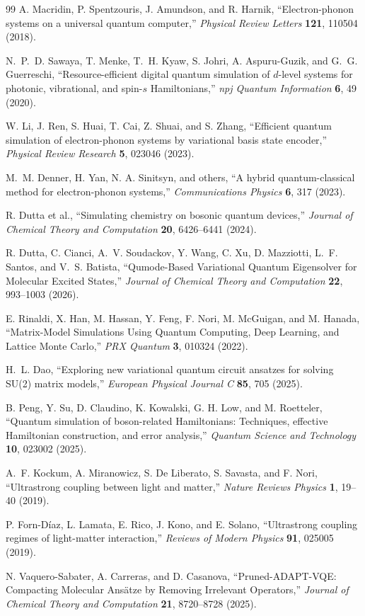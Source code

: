 \documentclass[
  reprint,
  amsmath,
  amssymb,
  aps,
  pra,
  nofootinbib,
  superscriptaddress,
  floatfix
]{revtex4-2}
\begin{document}
\begin{thebibliography}{99}
A. Macridin, P. Spentzouris, J. Amundson, and R. Harnik,
``Electron-phonon systems on a universal quantum computer,''
\emph{Physical Review Letters} \textbf{121}, 110504 (2018).

N.~P.~D. Sawaya, T. Menke, T.~H. Kyaw, S. Johri, A. Aspuru-Guzik, and G.~G. Guerreschi,
``Resource-efficient digital quantum simulation of $d$-level systems for photonic, vibrational, and spin-$s$ Hamiltonians,''
\emph{npj Quantum Information} \textbf{6}, 49 (2020).

W. Li, J. Ren, S. Huai, T. Cai, Z. Shuai, and S. Zhang,
``Efficient quantum simulation of electron-phonon systems by variational basis state encoder,''
\emph{Physical Review Research} \textbf{5}, 023046 (2023).

M.~M. Denner, H. Yan, N. A. Sinitsyn, and others,
``A hybrid quantum-classical method for electron-phonon systems,''
\emph{Communications Physics} \textbf{6}, 317 (2023).

R. Dutta et al.,
``Simulating chemistry on bosonic quantum devices,''
\emph{Journal of Chemical Theory and Computation} \textbf{20}, 6426--6441 (2024).

R. Dutta, C. Cianci, A.~V. Soudackov, Y. Wang, C. Xu, D. Mazziotti, L.~F. Santos, and V.~S. Batista,
``Qumode-Based Variational Quantum Eigensolver for Molecular Excited States,''
\emph{Journal of Chemical Theory and Computation} \textbf{22}, 993--1003 (2026).

E. Rinaldi, X. Han, M. Hassan, Y. Feng, F. Nori, M. McGuigan, and M. Hanada,
``Matrix-Model Simulations Using Quantum Computing, Deep Learning, and Lattice Monte Carlo,''
\emph{PRX Quantum} \textbf{3}, 010324 (2022).

H.~L. Dao,
``Exploring new variational quantum circuit ansatzes for solving SU(2) matrix models,''
\emph{European Physical Journal C} \textbf{85}, 705 (2025).

B. Peng, Y. Su, D. Claudino, K. Kowalski, G. H. Low, and M. Roetteler,
``Quantum simulation of boson-related Hamiltonians: Techniques, effective Hamiltonian construction, and error analysis,''
\emph{Quantum Science and Technology} \textbf{10}, 023002 (2025).

A.~F. Kockum, A. Miranowicz, S. De Liberato, S. Savasta, and F. Nori,
``Ultrastrong coupling between light and matter,''
\emph{Nature Reviews Physics} \textbf{1}, 19--40 (2019).

P. Forn-D{\'i}az, L. Lamata, E. Rico, J. Kono, and E. Solano,
``Ultrastrong coupling regimes of light-matter interaction,''
\emph{Reviews of Modern Physics} \textbf{91}, 025005 (2019).

N. Vaquero-Sabater, A. Carreras, and D. Casanova,
``Pruned-ADAPT-VQE: Compacting Molecular Ans\"atze by Removing Irrelevant Operators,''
\emph{Journal of Chemical Theory and Computation} \textbf{21}, 8720--8728 (2025).

\end{thebibliography}
\end{document}
